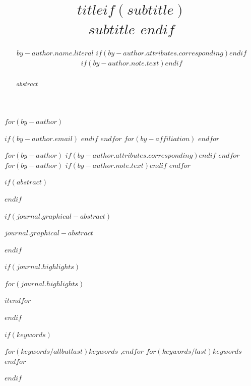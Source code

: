 
\begin{frontmatter}
\title{$title$$if(subtitle)$ \\\large{$subtitle$} $endif$}
$for(by-author)$\author[$for(by-author.affiliations)$$it.number$$sep$,$endfor$]{$by-author.name.literal$%
$if(by-author.attributes.corresponding)$$endif$%
$if(by-author.note.text)$$endif$}
$if(by-author.email)$  $endif$
$endfor$
$for(by-affiliation)$
$endfor$

$for(by-author)$
$if(by-author.attributes.corresponding)$$endif$
$endfor$
$for(by-author)$
$if(by-author.note.text)$$endif$
$endfor$
        
$if(abstract)$
\begin{abstract}
$abstract$
\end{abstract}
$endif$

$if(journal.graphical-abstract)$\begin{graphicalabstract}
$journal.graphical-abstract$
\end{graphicalabstract}
$endif$

$if(journal.highlights)$\begin{highlights}
$for(journal.highlights)$\item $it$$endfor$
\end{highlights}
$endif$

$if(keywords)$
\begin{keyword}
    $for(keywords/allbutlast)$$keywords$ \sep $endfor$
    $for(keywords/last)$$keywords$$endfor$
\end{keyword}
$endif$
\end{frontmatter}
    
